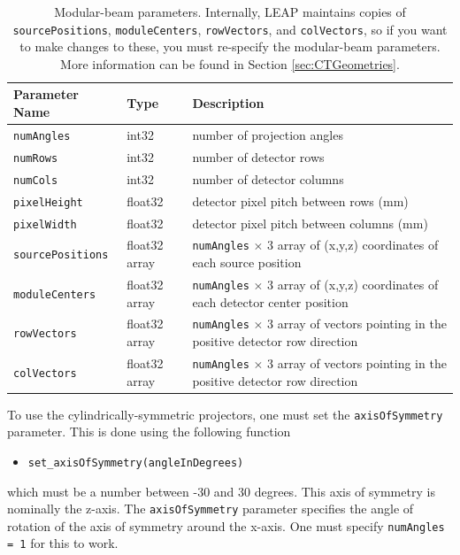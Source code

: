 \documentclass[11pt]{article}
\begin{document}
\begin{table}[h!]
\caption{Modular-beam parameters.  Internally, LEAP maintains copies of \texttt{sourcePositions}, \texttt{moduleCenters}, \texttt{rowVectors}, and \texttt{colVectors}, so if you want to make changes to these, you must re-specify the modular-beam parameters.  More information can be found in Section \ref{sec:CTGeometries}.} \label{tab:modularParameters}
\begin{tabular}{l|l|p{9cm}}
Parameter Name & Type & Description \\
\hline
\texttt{numAngles} & int32 & number of projection angles \\
\texttt{numRows} & int32 & number of detector rows \\
\texttt{numCols} & int32 & number of detector columns \\
\texttt{pixelHeight} & float32 & detector pixel pitch between rows (mm) \\
\texttt{pixelWidth} & float32 & detector pixel pitch between columns (mm) \\
\texttt{sourcePositions} & float32 array & \texttt{numAngles} $\times$ 3 array of (x,y,z) coordinates of each source position \\
\texttt{moduleCenters} & float32 array & \texttt{numAngles} $\times$ 3 array of (x,y,z) coordinates of each detector center position \\
\texttt{rowVectors} & float32 array & \texttt{numAngles} $\times$ 3 array of vectors pointing in the positive detector row direction \\
\texttt{colVectors} & float32 array & \texttt{numAngles} $\times$ 3 array of vectors pointing in the positive detector row direction
\end{tabular}
\end{table}

To use the cylindrically-symmetric projectors, one must set the \texttt{axisOfSymmetry} parameter.  This is done using the following function
\begin{itemize}
    \item[] \texttt{set\_axisOfSymmetry(angleInDegrees)}
\end{itemize}
which must be a number between -30 and 30 degrees.  This axis of symmetry is nominally the z-axis.  The \texttt{axisOfSymmetry} parameter specifies the angle of rotation of the axis of symmetry around the x-axis.  One must specify \texttt{numAngles = 1} for this to work.
\end{document}
